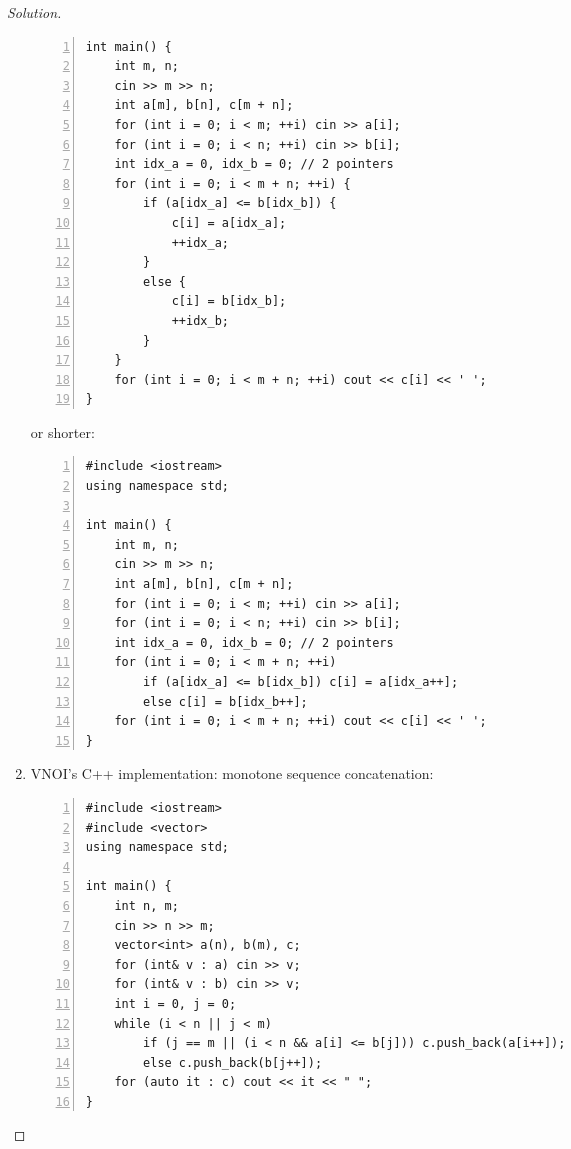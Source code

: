 \documentclass{article}
\begin{document}
\begin{proof}[Solution]
\begin{enumerate}
\begin{Verbatim}[numbers=left,xleftmargin=5mm]
int main() {
    int m, n;
    cin >> m >> n;
    int a[m], b[n], c[m + n];
    for (int i = 0; i < m; ++i) cin >> a[i];
    for (int i = 0; i < n; ++i) cin >> b[i];
    int idx_a = 0, idx_b = 0; // 2 pointers
    for (int i = 0; i < m + n; ++i) {
        if (a[idx_a] <= b[idx_b]) {
            c[i] = a[idx_a];
            ++idx_a;
        }
        else {
            c[i] = b[idx_b];
            ++idx_b;
        }
    }
    for (int i = 0; i < m + n; ++i) cout << c[i] << ' ';
}
        \end{Verbatim}
        or shorter:
        \begin{Verbatim}[numbers=left,xleftmargin=5mm]
#include <iostream>
using namespace std;

int main() {
    int m, n;
    cin >> m >> n;
    int a[m], b[n], c[m + n];
    for (int i = 0; i < m; ++i) cin >> a[i];
    for (int i = 0; i < n; ++i) cin >> b[i];
    int idx_a = 0, idx_b = 0; // 2 pointers
    for (int i = 0; i < m + n; ++i)
        if (a[idx_a] <= b[idx_b]) c[i] = a[idx_a++];
        else c[i] = b[idx_b++];
    for (int i = 0; i < m + n; ++i) cout << c[i] << ' ';
}
        \end{Verbatim}
        \item VNOI's C++ implementation: monotone sequence concatenation:
        \begin{Verbatim}[numbers=left,xleftmargin=5mm]
#include <iostream>
#include <vector>
using namespace std;

int main() {
    int n, m;
    cin >> n >> m;
    vector<int> a(n), b(m), c;
    for (int& v : a) cin >> v;
    for (int& v : b) cin >> v;
    int i = 0, j = 0;
    while (i < n || j < m)
        if (j == m || (i < n && a[i] <= b[j])) c.push_back(a[i++]);
        else c.push_back(b[j++]);
    for (auto it : c) cout << it << " ";
}
        \end{Verbatim}
    \end{enumerate}
\end{proof}
\end{document}
